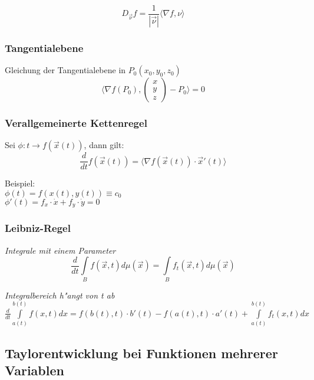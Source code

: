 \documentclass[10pt, a4paper, twocolumn]{scrartcl}
\begin{document}
\begin{displaymath}
 D_{\vec{\nu}}f=\frac{1}{|\vec{\nu}|}\langle \nabla f, \nu \rangle
\end{displaymath}

\subsubsection{Tangentialebene}

Gleichung der Tangentialebene in $P_0(x_0,y_0,z_0)$\\
\begin{displaymath}
 \langle\nabla f(P_0),
 \left(
  \begin{array}{c}
   x\\
   y\\
   z
  \end{array}
 \right ) -P_0\rangle=0
\end{displaymath}

\subsubsection{Verallgemeinerte Kettenregel}

Sei $\phi:t\to f(\vec{x}(t))$, dann gilt:
\begin{displaymath}
 \frac{d}{dt}f(\vec{x}(t))=\langle\nabla f(\vec{x}(t))\cdotp \vec{x}'(t)\rangle
\end{displaymath}

Beispiel:\\
$\phi(t)=f(x(t),y(t))\equiv c_0$\\
$\phi'(t)=f_x\cdotp\dot{x}+f_y\cdotp\dot{y}=0$

\subsubsection{Leibniz-Regel}

\textit{Integrale mit einem Parameter}
\begin{displaymath}
 \frac{d}{dt}\int\limits_B f(\vec{x},t)d\mu(\vec{x})=\int\limits_B f_t(\vec{x},t)d\mu(\vec{x})
\end{displaymath}

\textit{Integralbereich h"angt von t ab}\\
$\frac{d}{dt}\int\limits^{b(t)}_{a(t)}f(x,t)dx=f(b(t),t)\cdotp b'(t)-f(a(t),t)\cdotp a'(t)+\int\limits^{b(t)}_{a(t)}f_t(x,t)dx$


\subsection{Taylorentwicklung bei Funktionen mehrerer Variablen}
\end{document}
